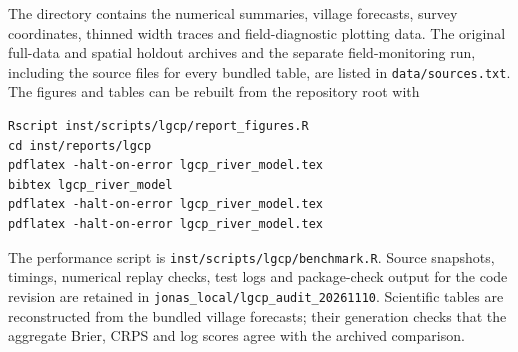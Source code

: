 \documentclass[11pt,a4paper]{article}
\begin{document}
The directory  contains the numerical summaries, village forecasts, survey coordinates, thinned width traces and field-diagnostic plotting data. The original full-data and spatial holdout archives and the separate field-monitoring run, including the source files for every bundled table, are listed in \texttt{data/sources.txt}. The figures and tables can be rebuilt from the repository root with
\begin{verbatim}
Rscript inst/scripts/lgcp/report_figures.R
cd inst/reports/lgcp
pdflatex -halt-on-error lgcp_river_model.tex
bibtex lgcp_river_model
pdflatex -halt-on-error lgcp_river_model.tex
pdflatex -halt-on-error lgcp_river_model.tex
\end{verbatim}
The performance script is \texttt{inst/scripts/lgcp/benchmark.R}. Source snapshots, timings, numerical replay checks, test logs and package-check output for the code revision are retained in \texttt{jonas\_local/lgcp\_audit\_20261110}. Scientific tables are reconstructed from the bundled village forecasts; their generation checks that the aggregate Brier, CRPS and log scores agree with the archived comparison.



\end{document}
